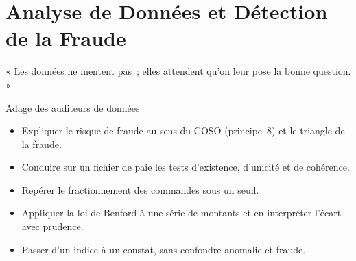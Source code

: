 
\chapter{Analyse de Données et Détection de la Fraude}
\label{chap:donnees-fraude}

\epigraph{%
    « Les données ne mentent pas~; elles attendent qu'on leur pose la
    bonne question. »%
}{Adage des auditeurs de données}


\begin{boxobjectifs}
\begin{itemize}
    \item Expliquer le risque de fraude au sens du COSO (principe~8) et le
          triangle de la fraude.
    \item Conduire sur un fichier de paie les tests d'existence, d'unicité
          et de cohérence.
    \item Repérer le fractionnement des commandes sous un seuil.
    \item Appliquer la loi de Benford à une série de montants et en
          interpréter l'écart avec prudence.
    \item Passer d'un indice à un constat, sans confondre anomalie et
          fraude.
\end{itemize}
\end{boxobjectifs}

